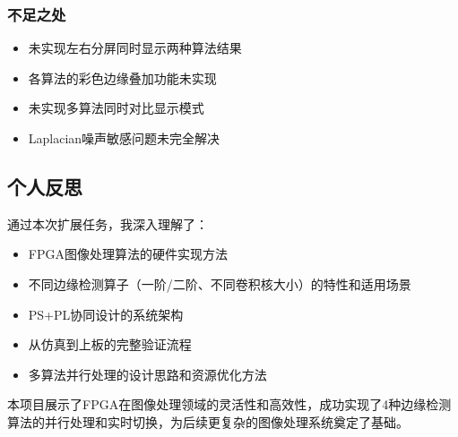 \subsubsection{不足之处}

\begin{itemize}
    \item 未实现左右分屏同时显示两种算法结果
    \item 各算法的彩色边缘叠加功能未实现
    \item 未实现多算法同时对比显示模式
    \item Laplacian噪声敏感问题未完全解决
\end{itemize}

\subsection{个人反思}

通过本次扩展任务，我深入理解了：

\begin{itemize}
    \item FPGA图像处理算法的硬件实现方法
    \item 不同边缘检测算子（一阶/二阶、不同卷积核大小）的特性和适用场景
    \item PS+PL协同设计的系统架构
    \item 从仿真到上板的完整验证流程
    \item 多算法并行处理的设计思路和资源优化方法
\end{itemize}

本项目展示了FPGA在图像处理领域的灵活性和高效性，成功实现了4种边缘检测算法的并行处理和实时切换，为后续更复杂的图像处理系统奠定了基础。
